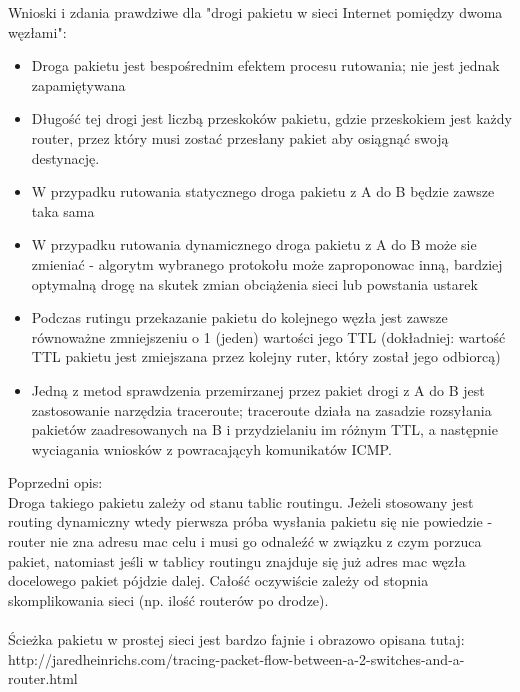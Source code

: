 Wnioski i zdania prawdziwe dla "drogi pakietu w sieci Internet pomiędzy dwoma węzłami":
\begin{itemize}
\item Droga pakietu jest bespośrednim efektem procesu rutowania; nie jest jednak zapamiętywana 
\item Długość tej drogi jest liczbą przeskoków pakietu, gdzie przeskokiem jest każdy router, przez który musi zostać przesłany pakiet aby osiągnąć swoją destynację.
\item W przypadku rutowania statycznego droga pakietu z A do B będzie zawsze taka sama
\item W przypadku rutowania dynamicznego droga pakietu z A do B może sie zmieniać - algorytm wybranego protokołu może zaproponowac inną, bardziej optymalną drogę na skutek zmian obciążenia sieci lub powstania ustarek
\item Podczas rutingu przekazanie pakietu do kolejnego węzła jest zawsze równoważne zmniejszeniu o 1 (jeden) wartości jego TTL (dokładniej: wartość TTL pakietu jest zmiejszana przez kolejny ruter, który został jego odbiorcą)
\item Jedną z metod sprawdzenia przemirzanej przez pakiet drogi z A do B jest zastosowanie narzędzia traceroute; traceroute działa na zasadzie rozsyłania pakietów zaadresowanych na B i przydzielaniu im różnym TTL, a następnie wyciagania wniosków z powracającyh komunikatów ICMP.
\end{itemize}


\vspace{0.4cm}
\noindent
Poprzedni opis: \\
Droga takiego pakietu zależy od stanu tablic routingu. Jeżeli stosowany jest routing dynamiczny wtedy pierwsza próba wysłania pakietu się nie powiedzie - router nie zna adresu mac celu i musi go odnaleźć w związku z czym porzuca pakiet, natomiast jeśli w tablicy routingu znajduje się już adres mac węzła docelowego pakiet pójdzie dalej. Całość oczywiście zależy od stopnia skomplikowania sieci (np. ilość routerów po drodze).
\\
\\
Ścieżka pakietu w prostej sieci jest bardzo fajnie i obrazowo opisana tutaj:\\
http://jaredheinrichs.com/tracing-packet-flow-between-a-2-switches-and-a-router.html



